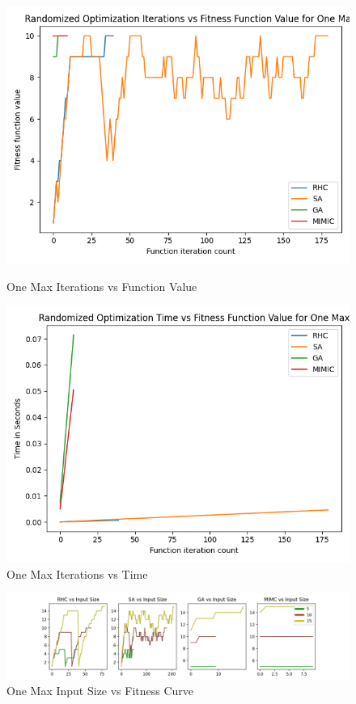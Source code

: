 \documentclass[11pt]{article}
\begin{document}
    \begin{figure}
        \begin{minipage}{0.4\textwidth}
            \centering
            \includegraphics[width=.9\linewidth]{onemax1.png}
            \caption{One Max Iterations vs Function Value}\label{Fig:One Max Iterations vs Function Value}
        \end{minipage}\hfill
        \begin{minipage}{0.4\textwidth}
            \centering
            \includegraphics[width=.9\linewidth]{onemax2.png}
            \caption{One Max Iterations vs Time}\label{Fig:One Max Iterations vs Time}
        \end{minipage}
    \end{figure}
    \begin{figure}
        \begin{center}
            \includegraphics[width=1\linewidth]{onemaxinput.png}
            \caption{One Max Input Size vs Fitness Curve}\label{Fig:One Max Input Size vs Fitness Curve}
        \end{center}
    \end{figure}
\end{document}
